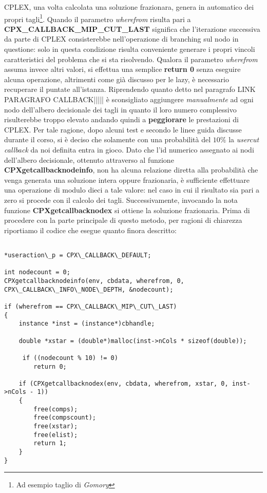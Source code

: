 \documentclass[11pt]{article}
\begin{document}
CPLEX, una volta calcolata una soluzione frazionara, genera in automatico dei propri tagli\footnote{Ad esempio taglio di \textit{Gomory}}. Quando il parametro \textit{wherefrom} risulta pari a \textbf{CPX\_CALLBACK\_MIP\_CUT\_LAST} significa che l'iterazione successiva da parte di CPLEX consisterebbe nell'operazione di branching sul nodo in questione: solo in questa condizione risulta conveniente generare i propri vincoli caratteristici del problema che si sta risolvendo. Qualora il parametro \textit{wherefrom} assuma invece altri valori, si effettua una semplice \textbf{return 0} senza eseguire alcuna operazione, altrimenti come già discusso per le lazy, è necessario recuperare il puntate all’istanza.
Riprendendo quanto detto nel paragrafo LINK PARAGRAFO CALLBACK||||| è sconsigliato aggiungere \textit{manualmente} ad ogni nodo dell’albero decisionale dei tagli in quanto il loro numero complessivo risulterebbe troppo elevato andando quindi a \textbf{peggiorare} le prestazioni di CPLEX. Per tale ragione, dopo alcuni test e secondo le linee guida discusse durante il corso, si è deciso che solamente con una probabilità del \textbf{$10\%$} la \textit{usercut callback} da noi definita entra in gioco. Dato che l'id numerico assegnato ai nodi dell'albero decisionale, ottenuto attraverso al funzione \textbf{CPXgetcallbacknodeinfo}, non ha alcuna relazione diretta alla probabilità che venga generata una soluzione intera oppure frazionaria, è sufficiente effettuare una operazione di modulo dieci a tale valore: nel caso in cui il risultato sia pari a zero si procede con il calcolo dei tagli. Successivamente, invocando la nota funzione \textbf{CPXgetcallbacknodex} si ottiene la soluzione frazionaria. Prima di procedere con la parte principale di questo metodo, per ragioni di chiarezza riportiamo il codice che esegue quanto finora descritto:


\begin{lstlisting}

*useraction\_p = CPX\_CALLBACK\_DEFAULT;
    
int nodecount = 0;
CPXgetcallbacknodeinfo(env, cbdata, wherefrom, 0, CPX\_CALLBACK\_INFO\_NODE\_DEPTH, &nodecount);
    
if (wherefrom == CPX\_CALLBACK\_MIP\_CUT\_LAST)
{
    instance *inst = (instance*)cbhandle;
        
    double *xstar = (double*)malloc(inst->nCols * sizeof(double));

     if ((nodecount % 10) != 0)
        return 0;

    if (CPXgetcallbacknodex(env, cbdata, wherefrom, xstar, 0, inst->nCols - 1))
    {
        free(comps);
        free(compscount);
        free(xstar);
        free(elist);
        return 1; 
    }
}

\end{lstlisting}
\end{document}
